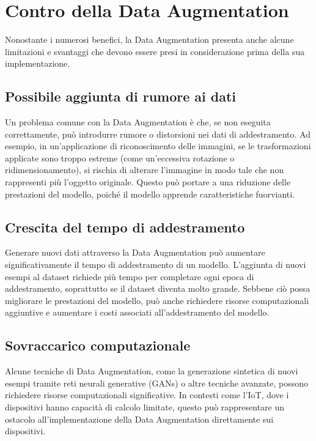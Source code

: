 \section{Contro della Data Augmentation}

Nonostante i numerosi benefici, la Data Augmentation presenta anche alcune limitazioni e svantaggi che devono essere presi in considerazione prima della sua implementazione.

\subsection{Possibile aggiunta di rumore ai dati}

Un problema comune con la Data Augmentation è che, se non eseguita correttamente, può introdurre rumore o distorsioni nei dati di addestramento. Ad esempio, in un'applicazione di riconoscimento delle immagini, se le trasformazioni applicate sono troppo estreme (come un'eccessiva rotazione o ridimensionamento), si rischia di alterare l'immagine in modo tale che non rappresenti più l'oggetto originale. Questo può portare a una riduzione delle prestazioni del modello, poiché il modello apprende caratteristiche fuorvianti.

\subsection{Crescita del tempo di addestramento}

Generare nuovi dati attraverso la Data Augmentation può aumentare significativamente il tempo di addestramento di un modello. L'aggiunta di nuovi esempi al dataset richiede più tempo per completare ogni epoca di addestramento, soprattutto se il dataset diventa molto grande. Sebbene ciò possa migliorare le prestazioni del modello, può anche richiedere risorse computazionali aggiuntive e aumentare i costi associati all'addestramento del modello.

\subsection{Sovraccarico computazionale}

Alcune tecniche di Data Augmentation, come la generazione sintetica di nuovi esempi tramite reti neurali generative (GANs) o altre tecniche avanzate, possono richiedere risorse computazionali significative. In contesti come l'IoT, dove i dispositivi hanno capacità di calcolo limitate, questo può rappresentare un ostacolo all'implementazione della Data Augmentation direttamente sui dispositivi.

